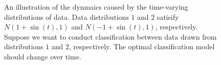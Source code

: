 \documentclass{article}
\begin{document}
\begin{figure}[!]
\setlength{\abovecaptionskip}{0pt}
\setlength{\belowcaptionskip}{0pt}
\centering 
{}
\caption{An illustration of the dynmaics caused by the time-varying distributions of data. Data distributions $1$ and $2$ satisify $N(1+\sin(t), 1)$ and $N(-1+\sin(t), 1)$, respectively.  Suppose we want to conduct classification between data drawn from distributions $1$ and $2$, respectively. The optimal classification model should change over time.}
\label{figure_illus_dynamics}
\end{figure}
\end{document}
